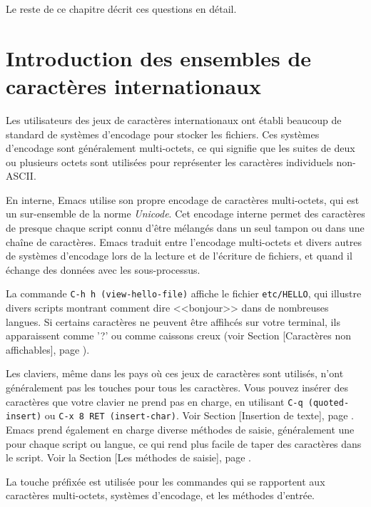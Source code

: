 Le reste de ce chapitre décrit ces questions en détail.

\section{Introduction des ensembles de caractères
  internationaux} 

Les utilisateurs des jeux de caractères internationaux ont établi
beaucoup de standard de systèmes d'encodage pour stocker les
fichiers. Ces systèmes d'encodage sont généralement multi-octets, ce
qui signifie que les suites de deux ou plusieurs octets sont utilisées
pour représenter les caractères individuels non-ASCII.

En interne, Emacs utilise son propre encodage de caractères
multi-octets, qui est un sur-ensemble de la norme
\textit{Unicode}. Cet encodage interne permet des caractères de
presque chaque script connu d'être mélangés dans un seul tampon ou
dans une chaîne de caractères. Emacs traduit entre l'encodage
multi-octets et divers autres de systèmes d'encodage lors de la
lecture et de l'écriture de fichiers, et quand il échange des données
avec les sous-processus.

La commande \texttt{C-h h (view-hello-file)} affiche le fichier
\texttt{etc/HELLO}, qui illustre divers scripts montrant comment dire
<<bonjour>> dans de nombreuses langues. Si certains caractères ne
peuvent être affihcés sur votre terminal, ils apparaissent comme '?'
ou comme caissons creux (voir Section  [Caractères non
affichables], page ). 

Les claviers, même dans les pays où ces jeux de caractères sont
utilisés, n'ont généralement pas les touches pour tous les
caractères. Vous pouvez insérer des caractères que votre clavier ne
prend pas en charge, en utilisant \texttt{C-q (quoted-insert)} ou
\texttt{C-x 8 RET (insert-char)}. Voir Section  [Insertion
de texte], page . Emacs prend également en charge diverse
méthodes de saisie, généralement une pour chaque script ou langue, ce
qui rend plus facile de taper des caractères dans le script. Voir la
Section  [Les méthodes de saisie], page . 

La touche préfixée  \RET est utilisée pour les commandes qui
se rapportent aux caractères multi-octets, systèmes d'encodage, et les
méthodes d'entrée. 

